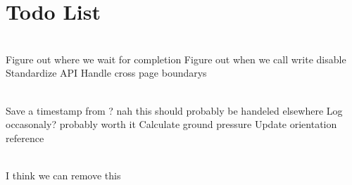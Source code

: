 \chapter{Todo List }
\hypertarget{todo}{}\label{todo}

\begin{DoxyRefList}
\item[Member \doxylink{classS25FL512_a81aac4f7bc78c0336b0b2e3a4dcb0519}{S25\+FL512\+::S25\+FL512} (uint8\+\_\+t chip\+Select\+Pin)]\hfill \\
\label{todo__todo000003}%
%
 Figure out where we wait for completion Figure out when we call write disable Standardize API Handle cross page boundary\textquotesingle{}s  
\item[Member \doxylink{classStateDeterminer_a85f0df4b7665e5e50e63c7720946e34b}{State\+Determiner\+::loop\+Once} (const \doxylink{structPose__s}{Pose\+\_\+s} \&pose)]\hfill \\
\label{todo__todo000002}%
%
 Save a timestamp from ? nah this should probably be handeled elsewhere Log occasonaly? probably worth it Calculate ground pressure Update orientation reference  
\item[Class \doxylink{classVolatileConfigurationMemory}{Volatile\+Configuration\+Memory\texorpdfstring{$<$}{<} N \texorpdfstring{$>$}{>}} ]\hfill \\
\label{todo__todo000001}%
%
I think we can remove this
\end{DoxyRefList}